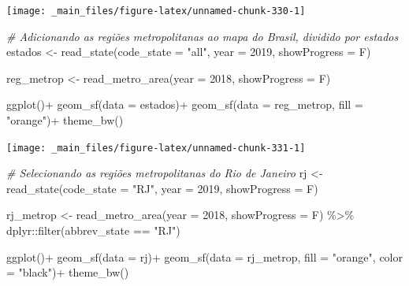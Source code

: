 \documentclass[
  brazilian,
]{book}
\newenvironment{Shaded}{\begin{snugshade}}{\end{snugshade}}
\newcommand{\AttributeTok}[1]{\textcolor[rgb]{0.77,0.63,0.00}{#1}}
\newcommand{\CommentTok}[1]{\textcolor[rgb]{0.56,0.35,0.01}{\textit{#1}}}
\newcommand{\DecValTok}[1]{\textcolor[rgb]{0.00,0.00,0.81}{#1}}
\newcommand{\FunctionTok}[1]{\textcolor[rgb]{0.00,0.00,0.00}{#1}}
\newcommand{\NormalTok}[1]{#1}
\newcommand{\OtherTok}[1]{\textcolor[rgb]{0.56,0.35,0.01}{#1}}
\newcommand{\SpecialCharTok}[1]{\textcolor[rgb]{0.00,0.00,0.00}{#1}}
\newcommand{\StringTok}[1]{\textcolor[rgb]{0.31,0.60,0.02}{#1}}
\begin{document}
\begin{center}\texttt{[image: \_main\_files/figure-latex/unnamed-chunk-330-1]} \end{center}

\begin{Shaded}
\begin{Highlighting}[]
\CommentTok{\# Adicionando as regiões metropolitanas ao mapa do Brasil, dividido por estados}
\NormalTok{estados }\OtherTok{\textless{}{-}} \FunctionTok{read\_state}\NormalTok{(}\AttributeTok{code\_state =} \StringTok{"all"}\NormalTok{,}
                      \AttributeTok{year =} \DecValTok{2019}\NormalTok{,}
                      \AttributeTok{showProgress =}\NormalTok{ F)}

\NormalTok{reg\_metrop }\OtherTok{\textless{}{-}} \FunctionTok{read\_metro\_area}\NormalTok{(}\AttributeTok{year =} \DecValTok{2018}\NormalTok{,}
                              \AttributeTok{showProgress =}\NormalTok{ F)}

\FunctionTok{ggplot}\NormalTok{()}\SpecialCharTok{+}
  \FunctionTok{geom\_sf}\NormalTok{(}\AttributeTok{data =}\NormalTok{ estados)}\SpecialCharTok{+}
  \FunctionTok{geom\_sf}\NormalTok{(}\AttributeTok{data =}\NormalTok{ reg\_metrop, }\AttributeTok{fill =} \StringTok{"orange"}\NormalTok{)}\SpecialCharTok{+}
  \FunctionTok{theme\_bw}\NormalTok{()}
\end{Highlighting}
\end{Shaded}

\begin{center}\texttt{[image: \_main\_files/figure-latex/unnamed-chunk-331-1]} \end{center}

\begin{Shaded}
\begin{Highlighting}[]
\CommentTok{\# Selecionando as regiões metropolitanas do Rio de Janeiro}
\NormalTok{rj }\OtherTok{\textless{}{-}} \FunctionTok{read\_state}\NormalTok{(}\AttributeTok{code\_state =} \StringTok{"RJ"}\NormalTok{,}
                 \AttributeTok{year =} \DecValTok{2019}\NormalTok{,}
                 \AttributeTok{showProgress =}\NormalTok{ F)}

\NormalTok{rj\_metrop }\OtherTok{\textless{}{-}} \FunctionTok{read\_metro\_area}\NormalTok{(}\AttributeTok{year =} \DecValTok{2018}\NormalTok{,}
                             \AttributeTok{showProgress =}\NormalTok{ F) }\SpecialCharTok{\%\textgreater{}\%} 
\NormalTok{  dplyr}\SpecialCharTok{::}\FunctionTok{filter}\NormalTok{(abbrev\_state }\SpecialCharTok{==} \StringTok{"RJ"}\NormalTok{)}

\FunctionTok{ggplot}\NormalTok{()}\SpecialCharTok{+}
  \FunctionTok{geom\_sf}\NormalTok{(}\AttributeTok{data =}\NormalTok{ rj)}\SpecialCharTok{+}
  \FunctionTok{geom\_sf}\NormalTok{(}\AttributeTok{data =}\NormalTok{ rj\_metrop, }\AttributeTok{fill =} \StringTok{"orange"}\NormalTok{, }\AttributeTok{color =} \StringTok{"black"}\NormalTok{)}\SpecialCharTok{+}
  \FunctionTok{theme\_bw}\NormalTok{()}
\end{Highlighting}
\end{Shaded}
\end{document}
